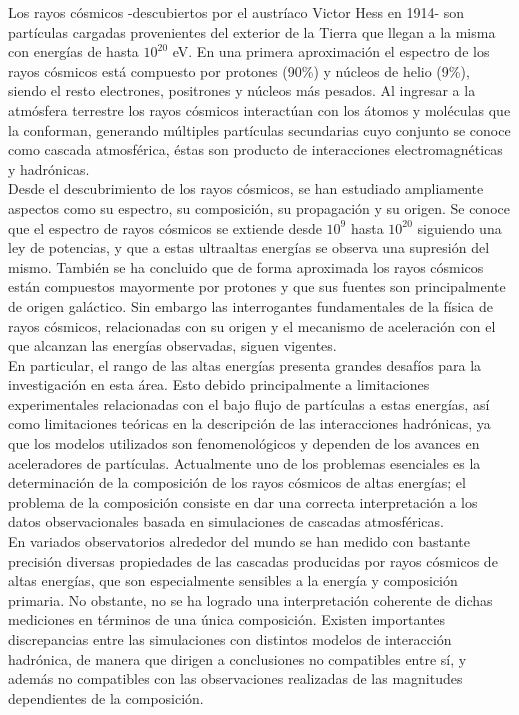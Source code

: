 Los rayos cósmicos -descubiertos por el austríaco Victor Hess en 1914- son partículas cargadas provenientes del exterior de la Tierra que llegan a la misma con energías de hasta $10^{20}$ eV. En una primera aproximaci\'on el espectro de los rayos c\'osmicos est\'a compuesto por protones (90\%) y núcleos de helio (9\%), siendo el resto electrones, positrones y núcleos más pesados. Al ingresar a la atmósfera terrestre los rayos c\'osmicos interactúan con los átomos y moléculas que la conforman, generando m\'ultiples partículas secundarias cuyo conjunto se conoce como cascada atmosf\'erica, éstas son producto de interacciones electromagnéticas y hadrónicas. \\

Desde el descubrimiento de los rayos cósmicos, se han estudiado ampliamente aspectos como su espectro, su composición, su propagación y su origen. Se conoce que el espectro de rayos cósmicos se extiende desde $10^9$ hasta $10^{20}$ siguiendo una ley de potencias, y que a estas ultraaltas energías se observa una supresión del mismo. También se ha concluido que de forma aproximada los rayos cósmicos están compuestos mayormente por protones y que sus fuentes son principalmente de origen galáctico. Sin embargo las interrogantes fundamentales de la física de rayos cósmicos, relacionadas con su origen y el mecanismo de aceleración con el que alcanzan las energías observadas, siguen vigentes. \\

En particular, el rango de las altas energías presenta grandes desafíos para la investigación en esta área. Esto debido principalmente a limitaciones experimentales relacionadas con el bajo flujo de partículas a estas energías, así como limitaciones teóricas en la descripción de las interacciones hadrónicas, ya que los modelos utilizados son fenomenológicos y dependen de los avances en aceleradores de partículas. Actualmente uno de los problemas esenciales es la determinación de la composición de los rayos cósmicos de altas energías; el problema de la composición consiste en dar una correcta interpretación a los datos observacionales basada en simulaciones de cascadas atmosféricas. \\

En variados observatorios alrededor del mundo se han medido con bastante precisión diversas propiedades de las cascadas producidas por rayos cósmicos de altas energías, que son especialmente sensibles a la energ\'ia y composición primaria. No obstante, no se ha logrado una interpretación coherente de dichas mediciones en términos de una única composición. Existen importantes discrepancias entre las simulaciones con distintos modelos de interacción hadrónica, de manera que dirigen a conclusiones no compatibles entre sí, y además no compatibles con las observaciones realizadas de las magnitudes dependientes de la composición. \\

